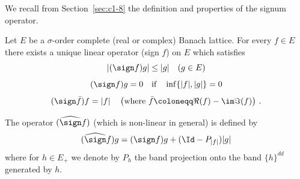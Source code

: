 We recall from Section~\ref{sec:c1-8} the definition and properties of the signum operator.
\begin{proposition}\label{prop:c2-2.1}
%
Let $E$ be a $\sigma$-order complete (real or complex) Banach lattice.
For every $f \in E$ there exists a unique linear operator (sign $f$) on $E$ which satisfies
\begin{equation}\label{eq:c2-2.1}
	|(\sign f)g| \leq |g| \quad (g \in E)
\end{equation}
\begin{equation}\label{eq:c2-2.2}
(\sign f)g = 0 \quad \text{if} \quad \inf\{|f|,|g|\} = 0
\end{equation}
\begin{equation}\label{eq:c2-2.3}
(\sign \bar{f})f = |f| \quad \left(\text{where } \bar{f} \coloneqq \Re(f) - \im\Im(f) \right)\,.
\end{equation}
\end{proposition}
The operator $(\widehat{\sign} f)$ (which is non-linear in general) is defined by
\begin{equation}\label{eq:c2-2.4}
(\widehat{\sign}f)g = (\sign f)g + (\Id - P_{|f|})|g|
\end{equation}
where for $h \in E_{+}$ we denote by $P_h$ the band projection onto the band $\{h\}^{dd}$ generated by $h$.

